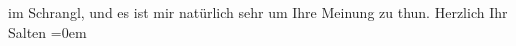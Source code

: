 \begin{ledgroupsized}[t]{13cm}
               im Schrangl, und es ist mir natürlich sehr um Ihre
               Meinung zu thun.\pend
           \pstart
           Herzlich Ihr {\\[\baselineskip]}\spacefill\mbox{Salten}\pend
           \leftskip=0em{}
         
         \endnumbering{}\end{ledgroupsized}  \newcommand{\dateiname}{L03286}\newcommand{\titel}{Felix Salten an Arthur Schnitzler, [28. 1. 1899]}\newcommand{\editorInnen}{Martin Anton Müller und Laura Untner}
      